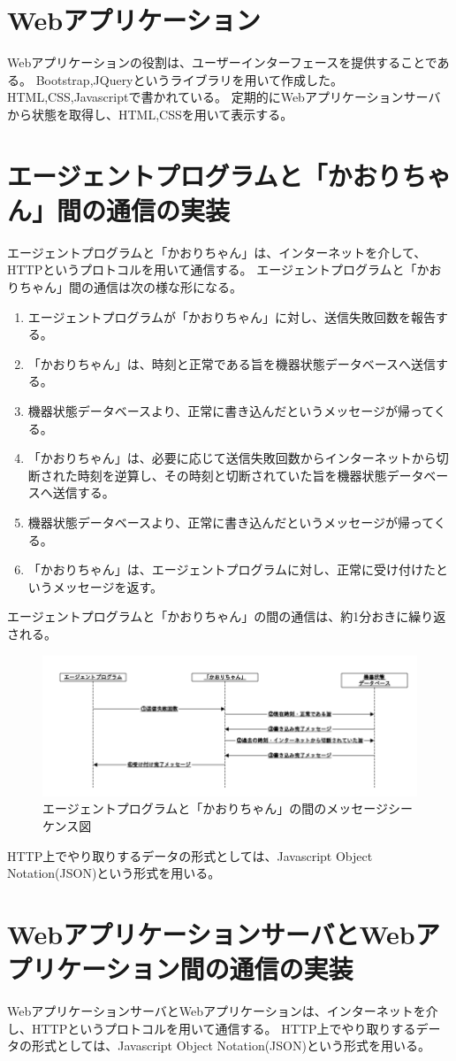 \section{Webアプリケーション}
Webアプリケーションの役割は、ユーザーインターフェースを提供することである。
Bootstrap,JQueryというライブラリを用いて作成した。HTML,CSS,Javascriptで書かれている。
定期的にWebアプリケーションサーバから状態を取得し、HTML,CSSを用いて表示する。

\section{エージェントプログラムと「かおりちゃん」間の通信の実装}
エージェントプログラムと「かおりちゃん」は、インターネットを介して、HTTPというプロトコルを用いて通信する。
エージェントプログラムと「かおりちゃん」間の通信は次の様な形になる。
\begin{enumerate}
	\item エージェントプログラムが「かおりちゃん」に対し、送信失敗回数を報告する。
	\item 「かおりちゃん」は、時刻と正常である旨を機器状態データベースへ送信する。
	\item 機器状態データベースより、正常に書き込んだというメッセージが帰ってくる。
	\item 「かおりちゃん」は、必要に応じて送信失敗回数からインターネットから切断された時刻を逆算し、その時刻と切断されていた旨を機器状態データベースへ送信する。
	\item 機器状態データベースより、正常に書き込んだというメッセージが帰ってくる。
	\item 「かおりちゃん」は、エージェントプログラムに対し、正常に受け付けたというメッセージを返す。
\end{enumerate}
エージェントプログラムと「かおりちゃん」の間の通信は、約1分おきに繰り返される。
\begin{figure}[htbp]
\includegraphics[width=16cm]{images/seq1.png}
\caption{エージェントプログラムと「かおりちゃん」の間のメッセージシーケンス図}
\label{fig:blockdiagram}
\end{figure}
HTTP上でやり取りするデータの形式としては、Javascript Object Notation(JSON)という形式を用いる。



\section{WebアプリケーションサーバとWebアプリケーション間の通信の実装}
WebアプリケーションサーバとWebアプリケーションは、インターネットを介し、HTTPというプロトコルを用いて通信する。
HTTP上でやり取りするデータの形式としては、Javascript Object Notation(JSON)という形式を用いる。

